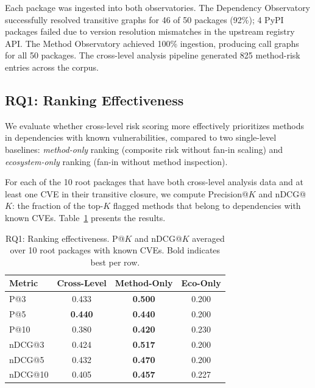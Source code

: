 \documentclass[conference]{IEEEtran}
\begin{document}
Each package was ingested into both observatories. The Dependency Observatory successfully resolved transitive graphs for 46 of 50 packages (92\%); 4 PyPI packages failed due to version resolution mismatches in the upstream registry API. The Method Observatory achieved 100\% ingestion, producing call graphs for all 50 packages. The cross-level analysis pipeline generated 825 method-risk entries across the corpus.

\subsection{RQ1: Ranking Effectiveness}
\label{subsec:rq1}

We evaluate whether cross-level risk scoring more effectively prioritizes methods in dependencies with known vulnerabilities, compared to two single-level baselines: \emph{method-only} ranking (composite risk without fan-in scaling) and \emph{ecosystem-only} ranking (fan-in without method inspection).

For each of the 10 root packages that have both cross-level analysis data and at least one CVE in their transitive closure, we compute Precision@$K$ and nDCG@$K$: the fraction of the top-$K$ flagged methods that belong to dependencies with known CVEs. Table~\ref{tab:rq1} presents the results.

\begin{table}[t]
    \centering
    \caption{RQ1: Ranking effectiveness. P@$K$ and nDCG@$K$ averaged over 10 root packages with known CVEs. Bold indicates best per row.}
    \label{tab:rq1}
    \begin{tabular}{l ccc}
        \toprule
        \textbf{Metric} & \textbf{Cross-Level} & \textbf{Method-Only} & \textbf{Eco-Only} \\
        \midrule
        P@3  & 0.433 & \textbf{0.500} & 0.200 \\
        P@5  & \textbf{0.440} & \textbf{0.440} & 0.200 \\
        P@10 & 0.380 & \textbf{0.420} & 0.230 \\
        \midrule
        nDCG@3  & 0.424 & \textbf{0.517} & 0.200 \\
        nDCG@5  & 0.432 & \textbf{0.470} & 0.200 \\
        nDCG@10 & 0.405 & \textbf{0.457} & 0.227 \\
        \bottomrule
    \end{tabular}
\end{table}
\end{document}
